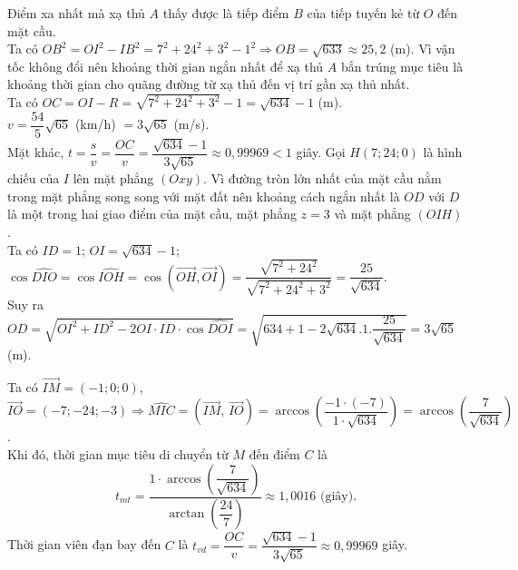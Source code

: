 \begin{ex}
{\begin{center}
\begin{tikzpicture}[line join=round, line cap=round,thick]
			\end{tikzpicture}
		\end{center}
		\begin{itemchoice}
			\itemch  Điểm xa nhất mà xạ thủ $A$ thấy được là tiếp điểm $B$ của tiếp tuyến kẻ từ $O$ đến mặt cầu.\\
			Ta có $OB^2=OI^2-IB^2=7^2+{{24}^2}+3^2-1^2\Rightarrow OB=\sqrt{633}\approx 25{,}2$ (m).
			\itemch Vì vận tốc không đổi nên khoảng thời gian ngắn nhất để xạ thủ $A$ bắn trúng mục tiêu là khoảng thời gian cho quãng đường từ xạ thủ đến vị trí gần xạ thủ nhất.\\
			Ta có $OC=OI-R=\sqrt{7^2+{{24}^2}+3^2}-1=\sqrt{634}-1$ (m).\\
			$v=\dfrac{54}{5}\sqrt{65}$ (km/h) $=3\sqrt{65}$ (m/s).\\
			Mặt khác, $t=\dfrac{s}{v}=\dfrac{OC}{v}=\dfrac{\sqrt{634}-1}{3\sqrt{65}}\approx 0{,}99969<1$ giây.
			\itemch
			Gọi $H(7;24;0)$ là hình chiếu của $I$ lên mặt phẳng $(Oxy)$. Vì đường tròn lớn nhất của mặt cầu nằm trong mặt phẳng song song với mặt đất nên khoảng cách ngắn nhất là $OD$ với $D$ là một trong hai giao điểm của mặt cầu, mặt phẳng $z=3$ và mặt phẳng $(OIH)$.\\
			Ta có $ID=1$; $OI=\sqrt{634}-1$; $\cos \widehat{DIO}=\cos \widehat{IOH}=\cos (\overrightarrow{OH},\overrightarrow{OI})=\dfrac{\sqrt{7^2+{{24}^2}}}{\sqrt{7^2+{{24}^2}+3^2}}=\dfrac{25}{\sqrt{634}}$.\\
			Suy ra $OD=\sqrt{OI^2+ID^2-2OI\cdot ID\cdot\cos \widehat{DOI}}=\sqrt{634+1-2\sqrt{634}.1.\dfrac{25}{\sqrt{634}}}=3\sqrt{65}$ (m).

			\itemch
			Ta có $\overrightarrow{IM}=(-1;0;0)$, $\overrightarrow{IO}=(-7;-24;-3)\Rightarrow \widehat{MIC}=(\overrightarrow{IM},\,\overrightarrow{IO})=\arccos \left(\dfrac{-1\cdot(-7)}{1\cdot\sqrt{634}} \right)=\arccos \left(\dfrac{7}{\sqrt{634}} \right)$.\\
			Khi đó, thời gian mục tiêu di chuyển từ $M$ đến điểm $C$ là \[{t_{mt}}=\dfrac{1\cdot\arccos \left(\dfrac{7}{\sqrt{634}} \right)}{\arctan \left( \dfrac{24}{7} \right) }\approx 1{,}0016 \text{ (giây)}.\]
			Thời gian viên đạn bay đến $C$ là ${t_{vd}}=\dfrac{OC}{v}=\dfrac{\sqrt{634}-1}{3\sqrt{65}}\approx 0{,}99969$ giây.
		\end{itemchoice}
	}
\end{ex}

